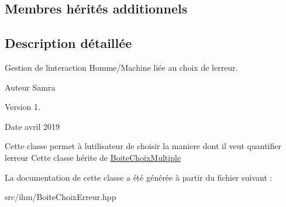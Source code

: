 \subsection*{Membres hérités additionnels}


\subsection{Description détaillée}
Gestion de l\textquotesingle{}interaction Homme/\+Machine liée au choix de l\textquotesingle{}erreur. 

\begin{DoxyAuthor}{Auteur}
Samra 
\end{DoxyAuthor}
\begin{DoxyVersion}{Version}
1. 
\end{DoxyVersion}
\begin{DoxyDate}{Date}
avril 2019
\end{DoxyDate}
Cette classe permet à l\textquotesingle{}utilisateur de choisir la maniere dont il veut quantifier l\textquotesingle{}erreur Cette classe hérite de \hyperlink{classBoiteChoixMultiple}{Boite\+Choix\+Multiple} 

La documentation de cette classe a été générée à partir du fichier suivant \+:\begin{DoxyCompactItemize}
\item 
src/ihm/Boite\+Choix\+Erreur.\+hpp\end{DoxyCompactItemize}
